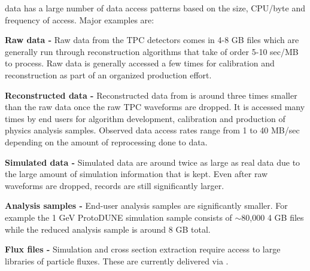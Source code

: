 \documentclass[../main-v1.tex]{subfiles}
\begin{document}

 data has a large number of data access patterns based on the size, CPU/byte and frequency of access.   Major examples are:

\begin{description}
    \item{\bf Raw data -}  Raw data from the TPC detectors comes in 4-8 GB files which are generally run through reconstruction algorithms that take of order 5-10 sec/MB to process. Raw data is generally accessed a few times for calibration and reconstruction as part of an organized production effort.  
    \item{\bf Reconstructed data -}  Reconstructed data from  is around three times smaller  than the raw data once the raw TPC waveforms are dropped. It is accessed many times by end users for algorithm development, calibration and production of physics analysis samples.   Observed data access rates range from 1 to 40 MB/sec depending on the amount of reprocessing done to data. 
    \item{\bf Simulated data - } Simulated data are around twice as large as real data due to the large amount of simulation information that is kept.  Even after raw waveforms are dropped, records are still significantly larger. 
    \item{\bf Analysis samples - } End-user analysis samples are significantly smaller.  For example the 1 GeV ProtoDUNE simulation sample consists of $\sim$80,000 4 GB files while the reduced analysis sample is around 8 GB total.  
    \item{\bf Flux files - } Simulation and cross section extraction require access to large libraries of particle fluxes.  These are currently delivered via . 
    
\end{description}
\end{document}
